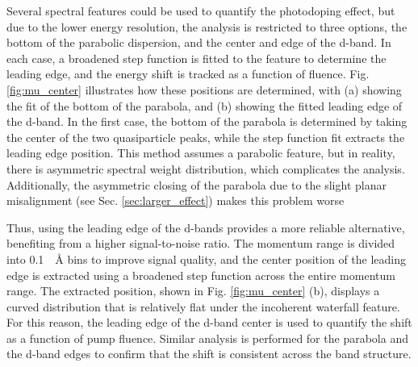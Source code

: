 Several spectral features could be used to quantify the photodoping effect, but due to the lower energy resolution, the analysis is restricted to three options, the bottom of the parabolic dispersion, and the center and edge of the  d-band.
In each case, a broadened step function is fitted to the feature to determine the leading edge, and the energy shift is tracked as a function of fluence.
Fig. \ref{fig:mu_center} illustrates how these positions are determined, with (a) showing the fit of the bottom of the parabola, and (b) showing the fitted leading edge of the  d-band.
In the first case, the bottom of the parabola is determined by taking the center of the two quasiparticle peaks, while the step function fit extracts the leading edge position.
This method assumes a parabolic feature, but in reality, there is asymmetric spectral weight distribution, which complicates the analysis.
Additionally, the asymmetric closing of the parabola due to the slight planar misalignment (see Sec. \ref{sec:larger_effect}) makes this problem worse

Thus, using the leading edge of the  d-bands provides a more reliable alternative, benefiting from a higher signal-to-noise ratio.
The momentum range is divided into \qty{0.1}{\per\angstrom} bins to improve signal quality, and the center position of the leading edge is extracted using a broadened step function across the entire momentum range.
The extracted position, shown in Fig. \ref{fig:mu_center} (b), displays a curved distribution that is relatively flat under the incoherent waterfall feature.
For this reason, the leading edge of the  d-band center is used to quantify the shift as a function of pump fluence.
Similar analysis is performed for the parabola and the d-band edges to confirm that the shift is consistent across the band structure.

